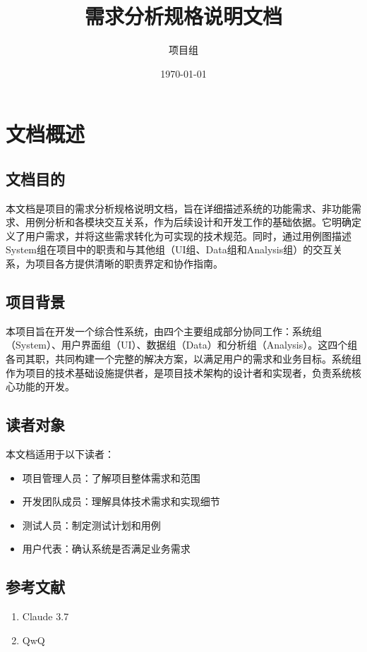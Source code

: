 \documentclass[a4paper,12pt]{article}
\title{需求分析规格说明文档}
\author{项目组}
\date{\today}
\begin{document}
\maketitle
\tableofcontents
\newpage

\section{文档概述}

\subsection{文档目的}

本文档是项目的需求分析规格说明文档，旨在详细描述系统的功能需求、非功能需求、用例分析和各模块交互关系，作为后续设计和开发工作的基础依据。它明确定义了用户需求，并将这些需求转化为可实现的技术规范。同时，通过用例图描述System组在项目中的职责和与其他组（UI组、Data组和Analysis组）的交互关系，为项目各方提供清晰的职责界定和协作指南。

\subsection{项目背景}

本项目旨在开发一个综合性系统，由四个主要组成部分协同工作：系统组（System）、用户界面组（UI）、数据组（Data）和分析组（Analysis）。这四个组各司其职，共同构建一个完整的解决方案，以满足用户的需求和业务目标。系统组作为项目的技术基础设施提供者，是项目技术架构的设计者和实现者，负责系统核心功能的开发。

\subsection{读者对象}

本文档适用于以下读者：
\begin{itemize}
  \item 项目管理人员：了解项目整体需求和范围
  \item 开发团队成员：理解具体技术需求和实现细节
  \item 测试人员：制定测试计划和用例
  \item 用户代表：确认系统是否满足业务需求
\end{itemize}

\subsection{参考文献}

\begin{enumerate}
  \item Claude 3.7
  \item QwQ
\end{enumerate}
\end{document}
